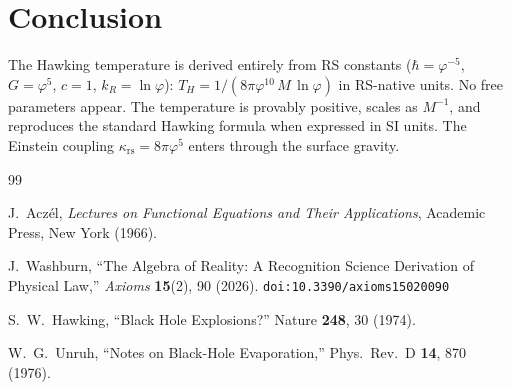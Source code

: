\documentclass[12pt,a4paper]{article}
\theoremstyle{definition}
\theoremstyle{remark}
\begin{document}
\section{Conclusion}
\label{sec:conclusion}

The Hawking temperature is derived entirely from RS constants
($\hbar = \varphi^{-5}$, $G = \varphi^5$, $c = 1$, $k_R = \ln\varphi$):
$T_H = 1/(8\pi\varphi^{10}\,M\,\ln\varphi)$ in RS-native units.
No free parameters appear.  The temperature is provably
positive, scales as $M^{-1}$, and reproduces the standard
Hawking formula when expressed in SI units.  The Einstein coupling $\kappa_{\mathrm{rs}} = 8\pi\varphi^5$
enters through the surface gravity.

\begin{thebibliography}{99}

J.~Acz\'el, \emph{Lectures on Functional Equations and Their Applications},
Academic Press, New York (1966).

J.~Washburn, ``The Algebra of Reality: A Recognition Science Derivation
of Physical Law,'' \emph{Axioms} \textbf{15}(2), 90 (2026).
\texttt{doi:10.3390/axioms15020090}

S.~W.~Hawking, ``Black Hole Explosions?'' Nature \textbf{248}, 30
(1974).

W.~G.~Unruh, ``Notes on Black-Hole Evaporation,'' Phys.\ Rev.\ D
\textbf{14}, 870 (1976).

\end{thebibliography}
\end{document}

